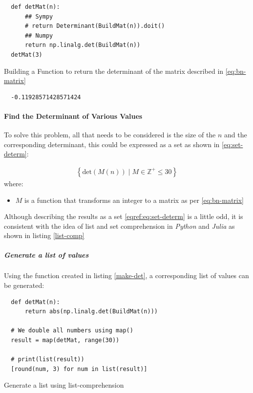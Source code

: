 \documentclass[11pt]{article}
\begin{document}
\begin{listing}[htbp]
\begin{verbatim}
  def detMat(n):
      ## Sympy
      # return Determinant(BuildMat(n)).doit()
      ## Numpy
      return np.linalg.det(BuildMat(n))
  detMat(3)
\end{verbatim}
\caption{\label{make-det}Building a Function to return the determinant of the matrix described in \eqref{eq:bn-matrix}}
\end{listing}

\begin{verbatim}
  -0.11928571428571424
\end{verbatim}

\paragraph{Find the Determinant of Various Values}
\label{find-the-determinant-of-various-values}
To solve this problem, all that needs to be considered is the size of the \(n\) and the corresponding determinant, this could be expressed as a set as shown in \eqref{eq:set-determ}:

\begin{align}
\left\{ \mathrm{det}\left( M(n) \right) \mid M \in \mathbb{Z}^{+} \leq 30  \right\} \label{eqref:eq:set-determ}
\end{align}
where:
\begin{itemize}
\item \(M\) is a function that transforms an integer to a matrix as per \eqref{eq:bn-matrix}
\end{itemize}

Although describing the results as a set \eqref{eqref:eq:set-determ} is a little odd, it is consistent with the idea of list and set comprehension in \emph{Python} \cite{DataStructuresPython} and \emph{Julia} \cite{MultidimensionalArraysJulia} as shown in listing \ref{list-comp}

\subparagraph{Generate a list of values}
\label{instead-use-absolute-value}
Using the function created in listing \ref{make-det}, a corresponding list of values can be generated:

\begin{listing}[htbp]
\begin{verbatim}
  def detMat(n):
      return abs(np.linalg.det(BuildMat(n)))

  # We double all numbers using map()
  result = map(detMat, range(30))

  # print(list(result))
  [round(num, 3) for num in list(result)]
\end{verbatim}
\caption{\label{list-comp}Generate a list using list-comprehension}
\end{listing}
\end{document}

